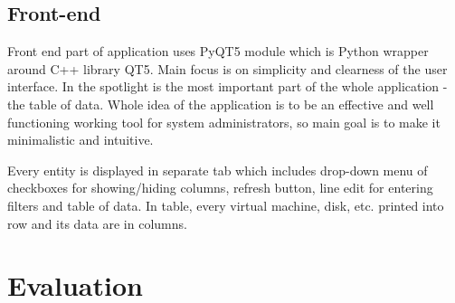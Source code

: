 \section{Front-end}
Front end part of application uses PyQT5 module which is Python wrapper around C++ library QT5. Main focus is on simplicity and clearness of the user interface. In the spotlight is the most important part of the whole application - the table of data. Whole idea of the application is to be an effective and well functioning working tool for system administrators, so main goal is to make it minimalistic and intuitive.

Every entity is displayed in separate tab which includes drop-down menu of checkboxes for showing/hiding columns, refresh button, line edit for entering filters and table of data. In table, every virtual machine, disk, etc. printed into row and its data are in columns.


\chapter{Evaluation}



